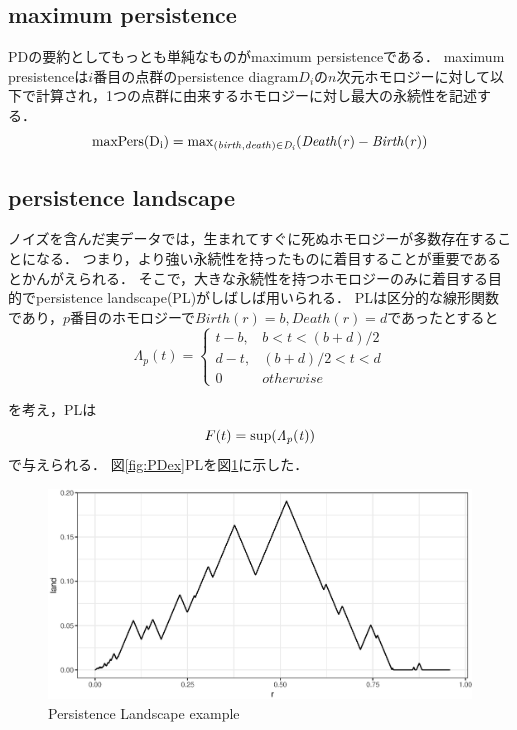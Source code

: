 \documentclass{jarticle}
\begin{document}
\subsection{maximum persistence}
PDの要約としてもっとも単純なものがmaximum persistenceである．
maximum presistenceは$i$番目の点群のpersistence diagram$D_i$の$n$次元ホモロジーに対して以下で計算され，1つの点群に由来するホモロジーに対し最大の永続性を記述する．
$$
\rm{maxPers}(D_i) = \rm{max}_{\it(birth, death)\in D_i}\it(Death(r) - Birth(r))
$$
\subsection{persistence landscape}
ノイズを含んだ実データでは，生まれてすぐに死ぬホモロジーが多数存在することになる．
つまり，より強い永続性を持ったものに着目することが重要であるとかんがえられる．
そこで，大きな永続性を持つホモロジーのみに着目する目的でpersistence landscape(PL)がしばしば用いられる．
PLは区分的な線形関数であり，$p$番目のホモロジーで$Birth(r)=b, Death(r)=d$であったとすると
\[
	\Lambda_p(t) = \begin{cases}
  	t-b, & b < t < (b+d)/2 \\
 	 d-t, & (b+d)/2< t < d\\
 	 0 & otherwise
	\end{cases}
\]

を考え，PLは
$$
F(t) = \rm{sup}\it(\Lambda_p(t))
$$
で与えられる．
図\ref{fig:PDex}PLを図\ref{fig:PLex}に示した．
\begin{figure}[H]
	\begin{center}
		\includegraphics[width=12cm]{fig/PL_example.eps}
		\caption{Persistence Landscape example}
		\label{fig:PLex}
	\end{center}
\end{figure}
\end{document}
